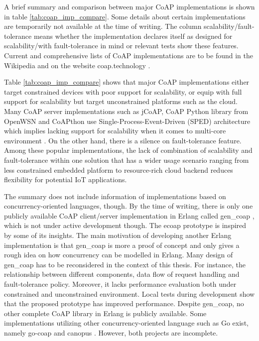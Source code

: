 A brief summary and comparison between major CoAP implementations is shown in table \ref{tab:coap_imp_compare}. Some details about certain implementations are temporarily not available at the time of writing. The column scalability/fault-tolerance means whether the implementation declares itself as designed for scalability/with fault-tolerance in mind or relevant tests show these features. Current and comprehensive lists of CoAP implementations are to be found in the Wikipedia \cite{coap_wiki} and on the website coap.technology \cite{coap_tech}.

Table \ref{tab:coap_imp_compare} shows that major CoAP implementations either target constrained devices with poor support for scalability, or equip with full support for scalability but target unconstrained platforms such as the cloud. Many CoAP server implementations such as jCoAP, CoAP Python library from OpenWSN and CoAPthon use Single-Process-Event-Driven (SPED) architecture which implies lacking support for scalability when it comes to multi-core environment \cite{kovatsch2015scalable}. On the other hand, there is a silence on fault-tolerance feature. Among these popular implementations, the lack of combination of scalability and fault-tolerance within one solution that has a wider usage scenario ranging from less constrained embedded platform to resource-rich cloud backend reduces flexibility for potential IoT applications.

The summary does not include information of implementations based on concurrency-oriented languages, though. By the time of writing, there is only one publicly available CoAP client/server implementation in Erlang called gen\_coap \cite{gen_coap}, which is not under active development though. The ecoap prototype is inspired by some of its insights. The main motivation of developing another Erlang implementation is that gen\_coap is more a proof of concept and only gives a rough idea on how concurrency can be modelled in Erlang. Many design of gen\_coap has to be reconsidered in the context of this thesis. For instance, the relationship between different components, data flow of request handling and fault-tolerance policy. Moreover, it lacks performance evaluation both under constrained and unconstrained environment. Local tests during development show that the proposed prototype has improved performance. Despite gen\_coap, no other complete CoAP library in Erlang is publicly available. Some implementations utilizing other concurrency-oriented language such as Go \cite{go} exist, namely go-coap \cite{go-coap} and canopus \cite{canopus}. However, both projects are incomplete.
 

